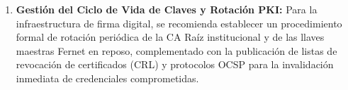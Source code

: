 \begin{enumerate}
  \item \textbf{Gestión del Ciclo de Vida de Claves y Rotación PKI:} Para la infraestructura de firma digital, se recomienda establecer un procedimiento formal de rotación periódica de la CA Raíz institucional y de las llaves maestras Fernet en reposo, complementado con la publicación de listas de revocación de certificados (CRL) y protocolos OCSP para la invalidación inmediata de credenciales comprometidas.
\end{enumerate}
